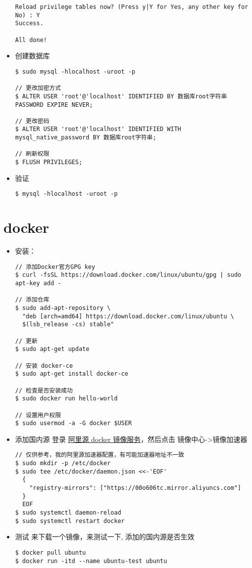 \begin{itemize}
\begin{lstlisting}
Reload privilege tables now? (Press y|Y for Yes, any other key for No) : Y
Success.

All done! 
\end{lstlisting}

\item 创建数据库
\begin{lstlisting}
$ sudo mysql -hlocalhost -uroot -p

// 更改加密方式
$ ALTER USER 'root'@'localhost' IDENTIFIED BY 数据库root字符串 PASSWORD EXPIRE NEVER;

// 更改密码
$ ALTER USER 'root'@'localhost' IDENTIFIED WITH mysql_native_password BY 数据库root字符串;

// 刷新权限
$ FLUSH PRIVILEGES;
\end{lstlisting}

\item 验证
\begin{lstlisting}
$ mysql -hlocalhost -uroot -p
\end{lstlisting}
\end{itemize}


\section{docker}

\begin{itemize}
\item 安装：
\begin{lstlisting}
// 添加Docker官方GPG key
$ curl -fsSL https://download.docker.com/linux/ubuntu/gpg | sudo apt-key add -

// 添加仓库
$ sudo add-apt-repository \
  "deb [arch=amd64] https://download.docker.com/linux/ubuntu \
  $(lsb_release -cs) stable"

// 更新 
$ sudo apt-get update

// 安装 docker-ce 
$ sudo apt-get install docker-ce

// 检查是否安装成功 
$ sudo docker run hello-world

// 设置用户权限
$ sudo usermod -a -G docker $USER

\end{lstlisting}

\item 添加国内源 
登录 \href{https://cr.console.aliyun.com/cn-hangzhou/instances/mirrors}{阿里源 docker 镜像服务}，然后点击 镜像中心->镜像加速器
\begin{lstlisting}
// 仅供参考，我的阿里源加速器配置，有可能加速器地址不一致
$ sudo mkdir -p /etc/docker
$ sudo tee /etc/docker/daemon.json <<-'EOF'
  {
    "registry-mirrors": ["https://00o606tc.mirror.aliyuncs.com"]
  }
  EOF
$ sudo systemctl daemon-reload
$ sudo systemctl restart docker
\end{lstlisting}

\item 测试
来下载一个镜像，来测试一下, 添加的国内源是否生效
\begin{lstlisting}
$ docker pull ubuntu
$ docker run -itd --name ubuntu-test ubuntu
\end{lstlisting}
\end{itemize}
